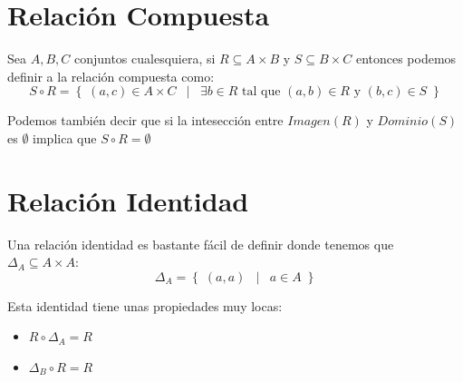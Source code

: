\documentclass[12pt, fleqn]{report}                             %
\DeclareMathOperator \Space     {\quad}                         %
\DeclareMathOperator \MiniSpace {\;}                            %
\newcommand \Such           {\MiniSpace | \MiniSpace}           %
\theoremstyle{break}                                            %
\newcommand{\Set}[1]            {\left\{ \; #1 \; \right\}}     %
\begin{document}
        \section{Relación Compuesta}

            Sea $A, B, C$ conjuntos cualesquiera, si $R \subseteq A \times B$ 
            y $S \subseteq B \times C$ entonces podemos definir a la relación
            compuesta como:            
            \begin{equation*}
                S \circ R = \Set{ (a,c) \in A \times C \Such
                        \exists b \in R \text{ tal que } 
                            (a,b) \in R \text{ y } (b, c) \in S
                    }
            \end{equation*}

            Podemos también decir que si la intesección entre $Imagen(R)$ y
            $Dominio(S)$ es $\emptyset$ implica que $S \circ R = \emptyset$


        \section{Relación Identidad}

            Una relación identidad es bastante fácil de definir donde tenemos
            que $\Delta_{A} \subseteq A \times A$:
            \begin{equation*}
                \Delta_{A} = \Set{ (a, a) \Such a \in A }
            \end{equation*}

            Esta identidad tiene unas propiedades muy locas:
            \begin{itemize}
                \item $R \circ \Delta_{A} = R$
                \item $\Delta_{B} \circ R = R$
            \end{itemize}







        \clearpage
\end{document}
